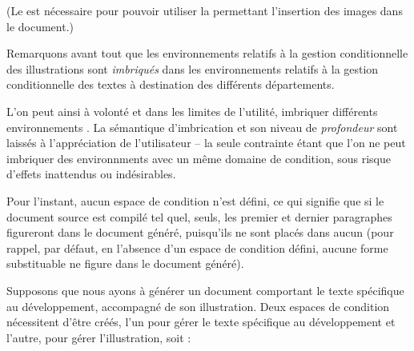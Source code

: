 \documentclass{article}
\begin{document}
\begin{codeblock}
    \begin{subcodeblock}
    \codestm{\lipsum[5][1-3]}
    \codestm{}
        \begin{subcodeblock}
        \end{subcodeblock}
    \codestm{}
    \codestm{\lipsum[5][4-5]}
    \end{subcodeblock}
\codestm{}
\codestm{\lipsum[6][1-3]}
\codestm{}
\end{codeblock}

\resumepar (Le  est nécessaire pour pouvoir utiliser la  permettant l'insertion des images dans le document.)

Remarquons avant tout que les environnements  relatifs à la gestion conditionnelle des illustrations sont \emph{imbriqués} dans les environnements  relatifs à la gestion conditionnelle des textes à destination des différents départements.

L'on peut ainsi à volonté et dans les limites de l'utilité, imbriquer différents environnements . La sémantique d'imbrication et son niveau de \emph{profondeur} sont laissés à l'appréciation de l'utilisateur -- la seule contrainte étant que l'on ne peut imbriquer des environnments  avec un même domaine de condition, sous risque d'effets inattendus ou indésirables.

Pour l'instant, aucun espace de condition n'est défini, ce qui signifie que si le document source est compilé tel quel, seuls, les premier et dernier paragraphes figureront dans le document généré, puisqu'ils ne sont placés dans aucun  (pour rappel, par défaut, en l'absence d'un espace de condition défini, aucune forme substituable ne figure dans le document généré).

\tutostep
Supposons que nous ayons à générer un document comportant le texte spécifique au développement, accompagné de son illustration. Deux espaces de condition nécessitent d'être créés, l'un pour gérer le texte spécifique au développement et l'autre, pour gérer l'illustration, soit :

\begin{codeblock}
\end{codeblock}
\end{document}
